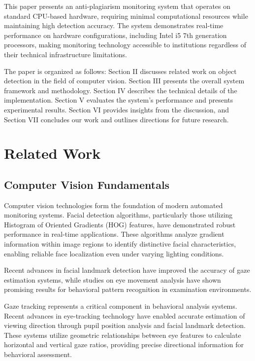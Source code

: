 \documentclass[conference]{IEEEtran}
\begin{document}
This paper presents an anti-plagiarism monitoring system that operates 
on standard CPU-based hardware, requiring minimal computational resources 
while maintaining high detection accuracy. The system demonstrates 
real-time performance on hardware configurations, including Intel i5 7th 
generation processors, making monitoring technology accessible to institutions 
regardless of their technical infrastructure limitations.

The paper is organized as follows: Section II discusses related work on object detection in the field of computer vision. Section III presents the overall system framework and methodology. Section IV describes the technical details of the implementation. Section V evaluates the system's performance and presents experimental results. Section VI provides insights from the discussion, and Section VII concludes our work and outlines directions for future research.

\section{Related Work}

\subsection{Computer Vision Fundamentals}

Computer vision technologies form the foundation of modern automated monitoring systems. 
Facial detection algorithms, particularly those utilizing Histogram of Oriented Gradients 
(HOG) features, have demonstrated robust performance in real-time applications\cite{hasan2021face}. 
These algorithms analyze gradient information within image regions to identify distinctive 
facial characteristics, enabling reliable face localization even under varying lighting conditions.

Recent advances in facial landmark detection have improved the accuracy of gaze estimation 
systems\cite{kazemi2014one}, while studies on eye movement analysis have shown promising 
results for behavioral pattern recognition in examination environments\cite{yu2019detection}.

Gaze tracking represents a critical component in behavioral analysis systems. Recent advances 
in eye-tracking technology have enabled accurate estimation of viewing direction through 
pupil position analysis and facial landmark detection\cite{dilini2021cheating}. These systems 
utilize geometric relationships between eye features to calculate horizontal and vertical 
gaze ratios, providing precise directional information for behavioral assessment\cite{el2023drowsiness}.
\end{document}
